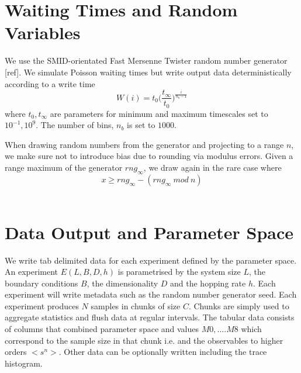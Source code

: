 \documentclass[pre,twocolumn,preprintnumbers,amsmath,amssymb,floatfix,nofootinbib]{revtex4}
\begin{document}
\section{Waiting Times and Random Variables}
We use the SMID-orientated Fast Mersenne Twister random number generator [ref]. We simulate Poisson waiting times but write output data deterministically according to a write time 
\begin{equation}
	W(i) = t_0 	\Big(\frac{t_{\infty}}{t_0}\Big)^{\tfrac{i}{n_{b}-1}}
\end{equation}
where $t_0,t_{\infty}$ are parameters for minimum and maximum timescales set to $10^{-1}, 10^9$. The number of bins, $n_b$ is set to $1000$.

When drawing random numbers from the generator and projecting to a range $n$, we make sure not to introduce bias due to rounding via modulus errors. Given a range maximum of the generator $rng_{\infty}$, we draw again in the rare case where 
\begin{equation}
	x \geq rng_{\infty} - (rng_{\infty}\ mod\ n)
\end{equation}
\\

\section{Data Output and Parameter Space}

We write tab delimited data for each experiment defined by the parameter space. An experiment $E(L,B,D,h)$ is parametrised by the system size $L$, the boundary conditions $B$, the dimensionality $D$ and the hopping rate $h$. Each experiment will write metadata such as the random number generator seed. Each experiment produces $N$ samples in chunks of size $C$. Chunks are simply used to aggregate statistics and flush data at regular intervals. The tabular data consists of columns that combined parameter space and values $M0,....M8$ which correspond to the sample size in that chunk i.e. and the observables to higher orders $<s^n>$. Other data can be optionally written including the trace histogram. 



\end{document}
